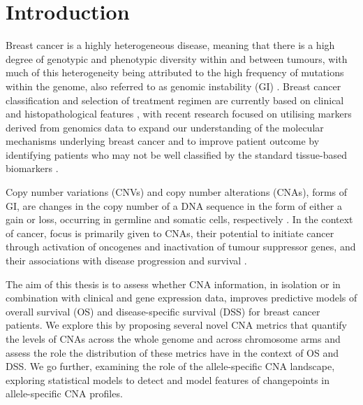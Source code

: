 \setcounter{page}{1} 

\section{Introduction}  
Breast cancer is a highly heterogeneous disease, meaning that there is a high degree of genotypic and phenotypic diversity within and between tumours, with much of this heterogeneity being attributed to the high frequency of mutations within the genome, also referred to as genomic instability (GI) \citep{pmid31078431, pmid36624542}. Breast cancer classification and selection of treatment regimen are currently based on clinical and histopathological features \citep{pmid23395906, pmid36482272}, with recent research focused on utilising markers derived from genomics data to expand our understanding of the molecular mechanisms underlying breast cancer and to improve patient outcome by identifying patients who may not be well classified by the standard tissue-based biomarkers \citep{pmid22522925, pmid23395906, pmid31413819, pmid37564937}.   
 
Copy number variations (CNVs) and copy number alterations (CNAs), forms of GI, are changes in the copy number of a DNA sequence in the form of either a gain or loss, occurring in germline and somatic cells, respectively \citep{pmid19566914, pmid23412801, pmid31874603}. In the context of cancer, focus is primarily given to CNAs, their potential to initiate cancer through activation of oncogenes and inactivation of tumour suppressor genes, and their associations with disease progression and survival \citep{pmid20033038, pmid27161491, pmid30178746, pmid30526857, pmid31085648, pmid36806386}.  

The aim of this thesis is to assess whether CNA information, in isolation or in combination with clinical and gene expression data, improves predictive models of overall survival (OS) and disease-specific survival (DSS) for breast cancer patients. We explore this by proposing several novel CNA metrics that quantify the levels of CNAs across the whole genome and across chromosome arms and assess the role the distribution of these metrics have in the context of OS and DSS. We go further, examining the role of the allele-specific CNA landscape, exploring statistical models to detect and model features of changepoints in allele-specific CNA profiles. 

